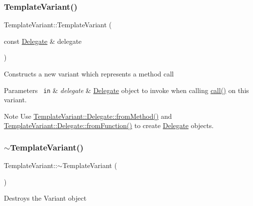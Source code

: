 \subsubsection{\texorpdfstring{TemplateVariant()}{TemplateVariant()}\hspace{0.1cm}{\footnotesize\ttfamily [8/9]}}
{\footnotesize\ttfamily Template\+Variant\+::\+Template\+Variant (\begin{DoxyParamCaption}\item[{const \mbox{\hyperlink{class_template_variant_1_1_delegate}{Delegate}} \&}]{delegate }\end{DoxyParamCaption})\hspace{0.3cm}{\ttfamily [inline]}}

Constructs a new variant which represents a method call 
\begin{DoxyParams}[1]{Parameters}
\mbox{\texttt{ in}}  & {\em delegate} & \mbox{\hyperlink{class_template_variant_1_1_delegate}{Delegate}} object to invoke when calling \mbox{\hyperlink{class_template_variant_aa36e21ae53656963fd75b799e4fd0808}{call()}} on this variant. \\
\hline
\end{DoxyParams}
\begin{DoxyNote}{Note}
Use \mbox{\hyperlink{class_template_variant_1_1_delegate_a6a013222ab665507469657d09c07c92b}{Template\+Variant\+::\+Delegate\+::from\+Method()}} and \mbox{\hyperlink{class_template_variant_1_1_delegate_a226f1f2e20f6d26fea2d989fd91bd8a8}{Template\+Variant\+::\+Delegate\+::from\+Function()}} to create \mbox{\hyperlink{class_template_variant_1_1_delegate}{Delegate}} objects. 
\end{DoxyNote}
\mbox{\label{class_template_variant_a8fa8f46048c3cde3c719932060101a0a}} 
\subsubsection{\texorpdfstring{$\sim$TemplateVariant()}{~TemplateVariant()}}
{\footnotesize\ttfamily Template\+Variant\+::$\sim$\+Template\+Variant (\begin{DoxyParamCaption}{ }\end{DoxyParamCaption})}

Destroys the Variant object \mbox{\label{class_template_variant_ad9594af6ca3e9f1f2688ac4f03fe106c}} 
